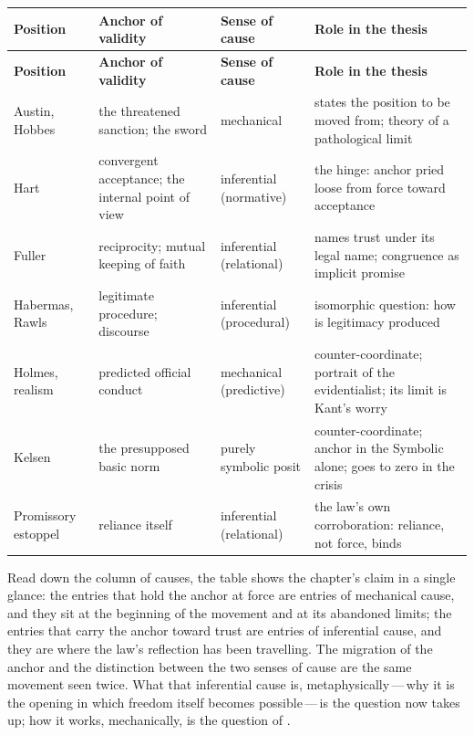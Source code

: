 \begin{center}
\small
\renewcommand{\arraystretch}{1.35}
\begin{longtable}{>{\RaggedRight\arraybackslash}p{2.9cm} >{\RaggedRight\arraybackslash}p{3.3cm} >{\RaggedRight\arraybackslash}p{2.3cm} >{\RaggedRight\arraybackslash}p{3.0cm}}
\toprule
\textcolor{rosedeep}{\textbf{\small Position}} & \textcolor{rosedeep}{\textbf{\small Anchor of validity}} & \textcolor{rosedeep}{\textbf{\small Sense of cause}} & \textcolor{rosedeep}{\textbf{\small Role in the thesis}} \\
\midrule
\endfirsthead
\toprule
\textcolor{rosedeep}{\textbf{\small Position}} & \textcolor{rosedeep}{\textbf{\small Anchor of validity}} & \textcolor{rosedeep}{\textbf{\small Sense of cause}} & \textcolor{rosedeep}{\textbf{\small Role in the thesis}} \\
\midrule
\endhead
\bottomrule
\endfoot
Austin, Hobbes & the threatened sanction; the sword & mechanical & states the position to be moved from; theory of a pathological limit \\
Hart & convergent acceptance; the internal point of view & inferential (normative) & the hinge: anchor pried loose from force toward acceptance \\
Fuller & reciprocity; mutual keeping of faith & inferential (relational) & names trust under its legal name; congruence as implicit promise \\
Habermas, Rawls & legitimate procedure; discourse & inferential (procedural) & isomorphic question: how is legitimacy produced \\
Holmes, realism & predicted official conduct & mechanical (predictive) & counter-coordinate; portrait of the evidentialist; its limit is Kant's worry \\
Kelsen & the presupposed basic norm & purely symbolic posit & counter-coordinate; anchor in the Symbolic alone; goes to zero in the crisis \\
Promissory estoppel & reliance itself & inferential (relational) & the law's own corroboration: reliance, not force, binds \\
\end{longtable}
\end{center}

\noindent
Read down the column of causes, the table shows the chapter's claim in a single glance: the entries that hold the anchor at force are entries of mechanical cause, and they sit at the beginning of the movement and at its abandoned limits; the entries that carry the anchor toward trust are entries of inferential cause, and they are where the law's reflection has been travelling. The migration of the anchor and the distinction between the two senses of cause are the same movement seen twice. What that inferential cause is, metaphysically\,---\,why it is the opening in which freedom itself becomes possible\,---\,is the question  now takes up; how it works, mechanically, is the question of .
